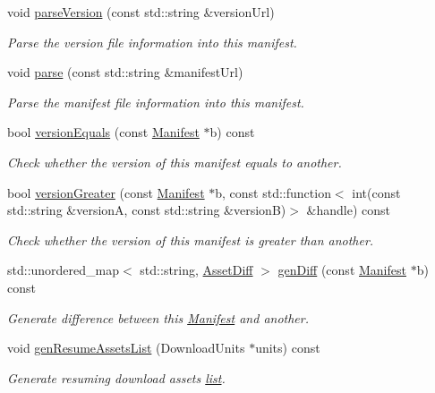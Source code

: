 \begin{DoxyCompactItemize}
void \hyperlink{classManifest_adf48429fda66eba3c19db8fc09f7f6d2}{parse\+Version} (const std\+::string \&version\+Url)
\begin{DoxyCompactList}\small\item\em Parse the version file information into this manifest. \end{DoxyCompactList}\item 
void \hyperlink{classManifest_abbaa9d1b3e86c2ff26d60a4d94209cd7}{parse} (const std\+::string \&manifest\+Url)
\begin{DoxyCompactList}\small\item\em Parse the manifest file information into this manifest. \end{DoxyCompactList}\item 
bool \hyperlink{classManifest_acafa28b00d8f3776432ce9b6b034214f}{version\+Equals} (const \hyperlink{classManifest}{Manifest} $\ast$b) const
\begin{DoxyCompactList}\small\item\em Check whether the version of this manifest equals to another. \end{DoxyCompactList}\item 
bool \hyperlink{classManifest_aa5922402496c604be194bc081dab7673}{version\+Greater} (const \hyperlink{classManifest}{Manifest} $\ast$b, const std\+::function$<$ int(const std\+::string \&versionA, const std\+::string \&versionB)$>$ \&handle) const
\begin{DoxyCompactList}\small\item\em Check whether the version of this manifest is greater than another. \end{DoxyCompactList}\item 
std\+::unordered\+\_\+map$<$ std\+::string, \hyperlink{structManifest_1_1AssetDiff}{Asset\+Diff} $>$ \hyperlink{classManifest_ae66cde752346c80a004ec637cf394b5f}{gen\+Diff} (const \hyperlink{classManifest}{Manifest} $\ast$b) const
\begin{DoxyCompactList}\small\item\em Generate difference between this \hyperlink{classManifest}{Manifest} and another. \end{DoxyCompactList}\item 
void \hyperlink{classManifest_a864bd328575f36a37733ab13ba5e5df0}{gen\+Resume\+Assets\+List} (Download\+Units $\ast$units) const
\begin{DoxyCompactList}\small\item\em Generate resuming download assets \hyperlink{protocollist-p}{list}. \end{DoxyCompactList}\item 

\end{DoxyCompactItemize}
